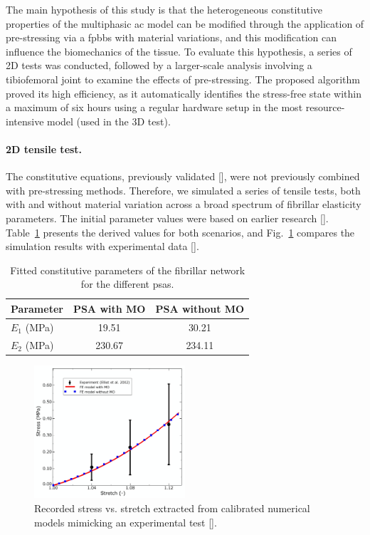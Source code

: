 The main hypothesis of this study is that the heterogeneous constitutive properties of the multiphasic \ac{ac} model can be modified through the application of  pre-stressing via a \ac{fpbbs} with material variations, and this modification can influence the biomechanics of the tissue. To evaluate this hypothesis, a series of 2D tests was conducted, followed by a larger-scale analysis involving a tibiofemoral joint to examine the effects of pre-stressing. The proposed algorithm proved its high efficiency, as it automatically identifies the stress-free state within a maximum of six hours using a regular hardware setup in the most resource-intensive model (used in the 3D test).

\paragraph{2D tensile test.} The constitutive equations, previously validated [\cite{sajjadinia2019}], were not previously combined with pre-stressing methods. Therefore, we simulated a series of tensile tests, both with and without material variation across a broad spectrum of fibrillar elasticity parameters. The initial parameter values were based on earlier research [\cite{wilson2007}]. Table~\ref{table:calibraion} presents the derived values for both scenarios, and Fig.~\ref{fig:calibration} compares the simulation results with experimental data [\cite{elliott2002}].
%
\begin{table}\centering
\caption{Fitted constitutive parameters of the fibrillar network for the different \acp{psa}.}
\label{table:calibraion}
\begin{tabular}{lcc}
\hline
\textbf{Parameter}  
& \textbf{PSA with MO}
& \textbf{PSA without MO}
\\
\hline
$E_1$ (MPa) 
& 19.51&    30.21 
\\
$E_2$ (MPa) & 230.67&    234.11 \\
\hline
\end{tabular}
\end{table}
%
\begin{figure}\centering
\includegraphics[width=0.5\textwidth]{img/calibration.jpg}
\caption{Recorded stress vs. stretch extracted from calibrated numerical models mimicking an experimental test [\cite{elliott2002}].}
\label{fig:calibration}
\end{figure}


